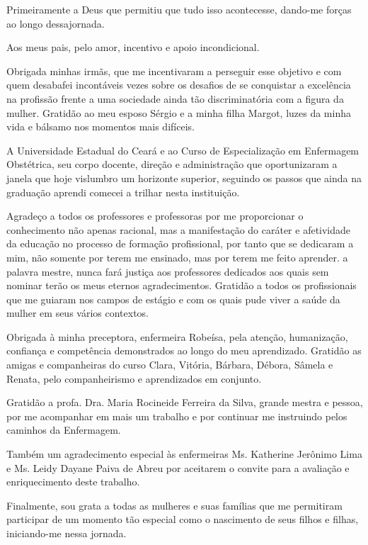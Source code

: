 Primeiramente a Deus que permitiu que tudo isso acontecesse, dando-me forças ao longo dessajornada.

Aos meus pais, pelo amor, incentivo e apoio incondicional.

Obrigada minhas irmãs, que me incentivaram a perseguir esse objetivo e com quem desabafei incontáveis vezes sobre os desafios de se conquistar a excelência na profissão frente a uma sociedade ainda tão discriminatória com a figura da mulher.
Gratidão ao meu esposo Sérgio e a minha filha Margot, luzes da minha vida e bálsamo nos momentos mais difíceis.

A Universidade Estadual do Ceará e ao Curso de Especialização em Enfermagem Obstétrica, seu corpo docente, direção e administração que oportunizaram a janela que hoje vislumbro um horizonte superior, seguindo os passos que ainda na graduação aprendi comecei a trilhar nesta instituição.

Agradeço a todos os professores e professoras por me proporcionar o conhecimento não apenas racional, mas a manifestação do caráter e afetividade da educação no processo de formação profissional, por tanto que se dedicaram a mim, não somente por terem me ensinado, mas por terem me feito aprender. a palavra mestre, nunca fará justiça aos professores dedicados aos quais sem nominar terão os meus eternos agradecimentos.
Gratidão a todos os profissionais que me guiaram nos campos de estágio e com os quais pude viver a saúde da mulher em seus vários contextos.

Obrigada à minha preceptora, enfermeira Robeísa, pela atenção, humanização, confiança e competência demonstrados ao longo do meu aprendizado.
Gratidão as amigas e companheiras do curso Clara, Vitória, Bárbara, Débora, Sâmela e Renata, pelo companheirismo e aprendizados em conjunto.

Gratidão a profa. Dra. Maria Rocineide Ferreira da Silva, grande mestra e pessoa, por me acompanhar em mais um trabalho e por continuar me instruindo pelos caminhos da Enfermagem.

Também um agradecimento especial às enfermeiras Ms. Katherine Jerônimo Lima e Ms. Leidy Dayane Paiva de Abreu por aceitarem o convite para a avaliação e enriquecimento deste trabalho. 

Finalmente, sou grata a todas as mulheres e suas famílias que me permitiram participar de um momento tão especial como o nascimento de seus filhos e filhas, iniciando-me nessa jornada.
